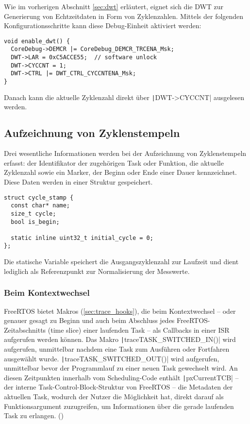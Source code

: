 Wie im vorherigen Abschnitt \ref{sec:dwt} erläutert, eignet sich die DWT zur
Generierung von Echtzeitdaten in Form von Zyklenzahlen. Mittels der folgenden
Konfigurationsschritte kann diese Debug-Einheit aktiviert werden:

\begin{code}
\begin{verbatim}
void enable_dwt() {
  CoreDebug->DEMCR |= CoreDebug_DEMCR_TRCENA_Msk;
  DWT->LAR = 0xC5ACCE55;  // software unlock
  DWT->CYCCNT = 1;
  DWT->CTRL |= DWT_CTRL_CYCCNTENA_Msk;
}
\end{verbatim}
\end{code}

Danach kann die aktuelle Zyklenzahl direkt über \texttt|DWT->CYCCNT|
ausgelesen werden.

\subsection{Aufzeichnung von Zyklenstempeln}

Drei wesentliche Informationen werden bei der Aufzeichnung von Zyklenstempeln
erfasst: der Identifikator der zugehörigen Task oder Funktion, die aktuelle
Zyklenzahl sowie ein Marker, der Beginn oder Ende einer Dauer kennzeichnet.
Diese Daten werden in einer Struktur gespeichert.

\begin{code}
\begin{verbatim}
struct cycle_stamp {
  const char* name;
  size_t cycle;
  bool is_begin;

  static inline uint32_t initial_cycle = 0;
};
\end{verbatim}
\end{code}

Die statische Variable speichert die Ausgangszyklenzahl zur Laufzeit und dient
lediglich als Referenzpunkt zur Normalisierung der Messwerte.

\subsubsection{Beim Kontextwechsel}

FreeRTOS bietet Makros (\ref{sec:trace_hooks}), die beim Kontextwechsel -- oder
genauer gesagt zu Beginn und auch beim Abschluss jedes FreeRTOS-Zeitabschnitts
(time slice) einer laufenden Task -- als Callbacks in einer ISR aufgerufen
werden können. Das Makro \texttt|traceTASK_SWITCHED_IN()| wird
aufgerufen, unmittelbar nachdem eine Task zum Ausführen oder Fortfahren
ausgewählt wurde. \texttt|traceTASK_SWITCHED_OUT()| wird aufgerufen,
unmittelbar bevor der Programmlauf zu einer neuen Task gewechselt wird. An
diesen Zeitpunkten innerhalb vom Scheduling-Code enthält
\texttt|pxCurrentTCB| -- der interne Task-Control-Block-Struktur von
FreeRTOS -- die Metadaten der aktuellen Task, wodurch der Nutzer die Möglichkeit
hat, direkt darauf als Funktionsargument zuzugreifen, um Informationen über die
gerade laufenden Task zu erlangen. (\cite{freertos_rtos_trace_hooks})

